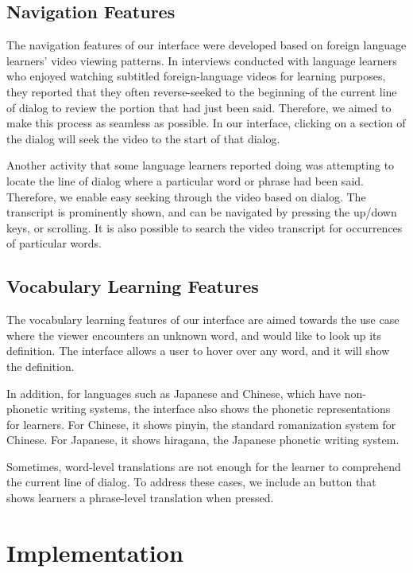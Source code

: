 \documentclass{sigchi}
\begin{document}
\subsection{Navigation Features}

The navigation features of our interface were developed based on foreign language learners' video viewing patterns. In interviews conducted with language learners who enjoyed watching subtitled foreign-language videos for learning purposes, they reported that they often reverse-seeked to the beginning of the current line of dialog to review the portion that had just been said. Therefore, we aimed to make this process as seamless as possible. In our interface, clicking on a section of the dialog will seek the video to the start of that dialog.

Another activity that some language learners reported doing was attempting to locate the line of dialog where a particular word or phrase had been said. Therefore, we enable easy seeking through the video based on dialog. The transcript is prominently shown, and can be navigated by pressing the up/down keys, or scrolling. It is also possible to search the video transcript for occurrences of particular words.

\subsection{Vocabulary Learning Features}

The vocabulary learning features of our interface are aimed towards the use case where the viewer encounters an unknown word, and would like to look up its definition. The interface allows a user to hover over any word, and it will show the definition.

In addition, for languages such as Japanese and Chinese, which have non-phonetic writing systems, the interface also shows the phonetic representations for learners. For Chinese, it shows pinyin, the standard romanization system for Chinese. For Japanese, it shows hiragana, the Japanese phonetic writing system.

Sometimes, word-level translations are not enough for the learner to comprehend the current line of dialog. To address these cases, we include an button that shows learners a phrase-level translation when pressed.

\section{Implementation}
\end{document}
